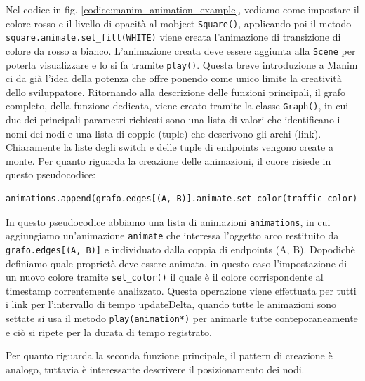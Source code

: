 \documentclass[binding=0.6cm]{sapthesis}
\begin{document}
Nel codice in fig. \ref{codice:manim_animation_example}, vediamo come impostare il colore rosso e il livello di opacità al mobject \lstinline|Square()|,
applicando poi il metodo \lstinline|square.animate.set_fill(WHITE)| viene creata l'animazione di transizione di colore da rosso a bianco.
L'animazione creata deve essere aggiunta alla \lstinline|Scene| per poterla visualizzare e lo si fa tramite \lstinline|play()|.
Questa breve introduzione a Manim ci da già l'idea della potenza che offre ponendo come unico limite la creatività dello sviluppatore.
Ritornando alla descrizione delle funzioni principali, il grafo completo, della funzione dedicata, viene creato tramite la classe
\lstinline|Graph()|, in cui due dei principali parametri richiesti sono una lista di valori che identificano i nomi dei nodi e una lista di coppie (tuple)
che descrivono gli archi (link). Chiaramente la liste degli switch e delle tuple di endpoints vengono create a monte. Per quanto riguarda
la creazione delle animazioni, il cuore risiede in questo pseudocodice:


{\scriptsize %
\begin{lstlisting}[language=Python, caption={creazione animazione traffico}, label={codice:traffic_animation_example}]
animations.append(grafo.edges[(A, B)].animate.set_color(traffic_color))
\end{lstlisting}
}
In questo pseudocodice abbiamo una lista di animazioni \lstinline|animations|, in cui aggiungiamo un'animazione \lstinline|animate| che interessa l'oggetto arco 
restituito da \lstinline|grafo.edges[(A, B)]| e individuato dalla coppia di endpoints (A, B). Dopodichè definiamo quale proprietà deve essere animata,
 in questo caso l'impostazione di un nuovo colore tramite \lstinline|set_color()| il quale è il colore corrispondente al timestamp correntemente analizzato.
Questa operazione viene effettuata per tutti i link per l'intervallo di tempo updateDelta, quando tutte le animazioni sono settate si usa
il metodo \lstinline|play(animation*)| per animarle tutte conteporaneamente e ciò si ripete per la durata di tempo registrato.

Per quanto riguarda la seconda funzione principale, il pattern di creazione è analogo, tuttavia è interessante descrivere il posizionamento dei nodi.
\end{document}
